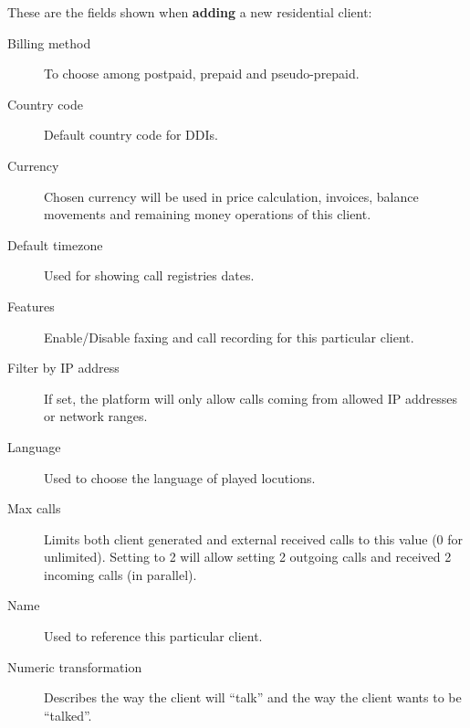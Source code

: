 \documentclass[letterpaper,10pt,english]{sphinxmanual}
\begin{document}
These are the fields shown when \textbf{adding} a new residential client:
\begin{description}
\item[{Billing method}] \leavevmode{}\label{administration_portal/brand/clients/residential:term-billing-method}
To choose among postpaid, prepaid and pseudo-prepaid.

\item[{Country code}] \leavevmode{}\label{administration_portal/brand/clients/residential:term-country-code}
Default country code for DDIs.

\item[{Currency}] \leavevmode{}\label{administration_portal/brand/clients/residential:term-currency}
Chosen currency will be used in price calculation, invoices, balance movements and
remaining money operations of this client.

\item[{Default timezone}] \leavevmode{}\label{administration_portal/brand/clients/residential:term-default-timezone}
Used for showing call registries dates.

\item[{Features}] \leavevmode{}\label{administration_portal/brand/clients/residential:term-features}
Enable/Disable faxing and call recording for this particular client.

\item[{Filter by IP address}] \leavevmode{}\label{administration_portal/brand/clients/residential:term-filter-by-ip-address}
If set, the platform will only allow calls coming from allowed IP addresses or network ranges.

\item[{Language}] \leavevmode{}\label{administration_portal/brand/clients/residential:term-language}
Used to choose the language of played locutions.

\item[{Max calls}] \leavevmode{}\label{administration_portal/brand/clients/residential:term-max-calls}
Limits both client generated and external received calls to this value (0 for unlimited). Setting to 2 will allow
setting 2 outgoing calls and received 2 incoming calls (in parallel).

\item[{Name}] \leavevmode{}\label{administration_portal/brand/clients/residential:term-name}
Used to reference this particular client.

\item[{Numeric transformation}] \leavevmode{}\label{administration_portal/brand/clients/residential:term-numeric-transformation}
Describes the way the client will ``talk'' and the way the client wants to be ``talked''.

\end{description}
\end{document}
